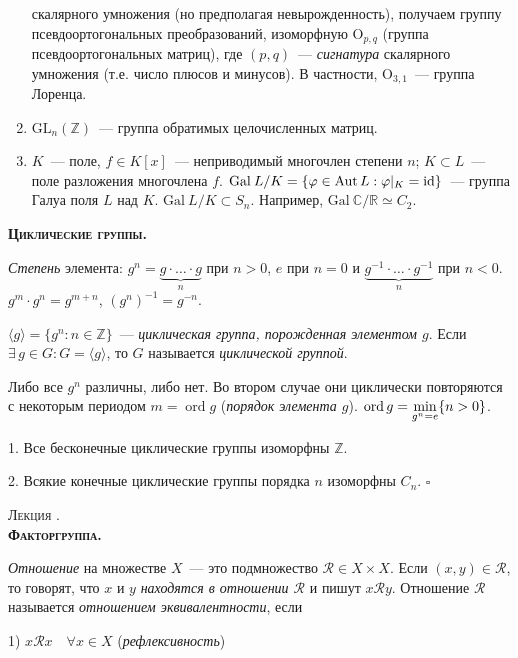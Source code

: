 \documentclass[a4paper]{article}
\newcounter{lec}
\renewcommand{\thelec}{\Roman{lec}}
\newcommand*{\lecture}[1]{\refstepcounter{lec}\vspace{20pt}
\begin{center}{\rmfamily\textsc{Лекция \thelec. \\ \textbf{#1}}}\vspace{5pt}
\end{center}}
\newcommand*{\tema}[1]{\vspace{20pt}
\begin{center}{\textbf{\textsc{#1.}}}\vspace{5pt}
\end{center}}
\newcommand{\Aut}{\mathop{\mathrm{Aut}}\nolimits}
\newcommand{\ord}{\mathop{\mathrm{ord}}\nolimits}
\newcommand*{\p}[1]{#1\nobreak\discretionary{}{\hbox{$\mathsurround=0pt #1$}}{}}
\begin{document}
\begin{enumerate}
  скалярного умножения (но предполагая невырожденность), получаем
  группу псевдоортогональных преобразований, изоморфную $\mathrm{O}_{p,q}$ (группа
  псевдоортогональных матриц), где $(p,q)$~--- \emph{сигнатура}
  скалярного умножения (т.е. число плюсов и минусов). В частности,
  $\mathrm{O}_{3,1}$~--- группа Лоренца.
  \item $\mathrm{\mathrm{GL}}_n(\mathbb{Z})$~--- группа обратимых целочисленных
  матриц.
  \item $K$~--- поле, $f\in K[x]$~--- неприводимый многочлен степени
  $n$; $K\subset L$~--- поле разложения многочлена $f$. $\mathrm{Gal}\: L/K=
  \{\varphi\in \Aut L: \varphi|_K\p=\mathrm{id}\}$~--- группа Галуа поля $L$
  над $K$. $\mathrm{Gal}\: L/K\subset S_n$. Например, $\mathrm{Gal}\: \mathbb{C}/\mathbb{R}
  \simeq C_2$.
\end{enumerate}

\tema{Циклические группы}

\emph{Степень} элемента: $g^n=\underbrace{g\cdot\ldots\cdot g}_{n}$
при $n>0$, $e$ при $n=0$ и $\underbrace{g^{-1}\cdot\ldots\cdot
g^{-1}}_{n}$ при $n<0$. $g^m\cdot g^n=g^{m+n}$, $(g^n)^{-1}=g^{-n}$.

$\langle g\rangle=\{g^n: n\in \mathbb{Z}\}$~--- \emph{циклическая
группа, порожденная элементом $g$}. Если $\exists \, g\in G:
G=\langle g\rangle$, то $G$ называется \emph{циклической группой}.

Либо все $g^n$ различны, либо нет. Во втором случае они циклически
повторяются с некоторым периодом $m=\ord g$ (\emph{порядок элемента
$g$}). $\ord g=\min\limits_{g^n=e}\{n\p>0\}$.

\begin{theorem}
1. Все бесконечные циклические группы изоморфны $\mathbb{Z}$.

2. Всякие конечные циклические группы порядка $n$ изоморфны $C_n$.
$\square$
\end{theorem}
\lecture{Факторгруппа.}

\emph{Отношение} на множестве $X$~--- это подмножество
$\mathcal{R}\in X\times X$. Если $(x,y)\in \mathcal{R}$, то говорят,
что $x$ и $y$ \emph{находятся в отношении $\mathcal{R}$} и пишут
$x\mathcal{R}y$. Отношение $\mathcal{R}$ называется \emph{отношением
эквивалентности}, если

1) $x\mathcal{R}x\quad \forall x\in X$ \quad (\emph{рефлексивность})
\end{document}

